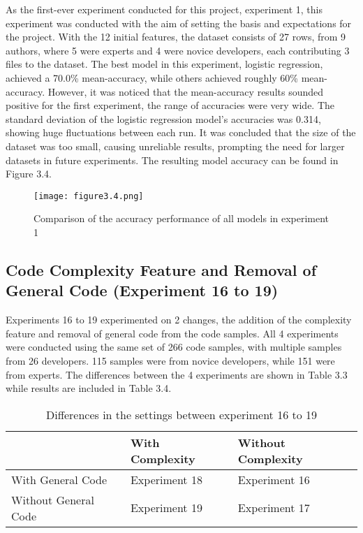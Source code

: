 \documentclass{report}
\begin{document}
As the first-ever experiment conducted for this project, experiment 1, this experiment was conducted with the aim of setting the basis and expectations for the project. With the 12 initial features, the dataset consists of 27 rows, from 9 authors, where 5 were experts and 4 were novice developers, each contributing 3 files to the dataset. The best model in this experiment, logistic regression, achieved a 70.0\% mean-accuracy, while others achieved roughly 60\% mean-accuracy. However, it was noticed that the mean-accuracy results sounded positive for the first experiment, the range of accuracies were very wide. The standard deviation of the logistic regression model’s accuracies was 0.314, showing huge fluctuations between each run. It was concluded that the size of the dataset was too small, causing unreliable results, prompting the need for larger datasets in future experiments. The resulting model accuracy can be found in Figure 3.4.

\begin{figure}[h!]
\centering
\texttt{[image: figure3.4.png]}
\caption{Comparison of the accuracy performance of all models in experiment 1}
\end{figure}

\subsection{Code Complexity Feature and Removal of General Code (Experiment 16 to 19)}

Experiments 16 to 19 experimented on 2 changes, the addition of the complexity feature and removal of general code from the code samples. All 4 experiments were conducted using the same set of 266 code samples, with multiple samples from 26 developers. 115 samples were from novice developers, while 151 were from experts. The differences between the 4 experiments are shown in Table 3.3 while results are included in Table 3.4.

\begin{table}[h!]
\centering
\begin{tabular}{l|ll}
\hline
& With Complexity & Without Complexity \\
\hline
With General Code & Experiment 18 & Experiment 16 \\
Without General Code & Experiment 19 & Experiment 17 \\
\hline
\end{tabular}
\caption{Differences in the settings between experiment 16 to 19}
\label{tab:3.3}
\end{table}
\end{document}
